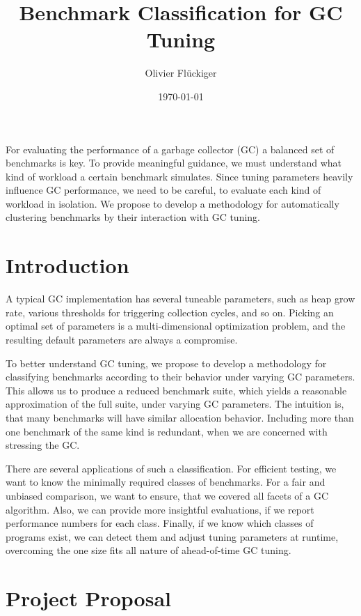 \documentclass[12pt]{article}
\title{Benchmark Classification for GC Tuning}
\author{Olivier Fl\"uckiger}
\date{\today}
\begin{document}
\maketitle

\abstract

For evaluating the performance of a garbage collector (GC) a balanced set of benchmarks is key.
To provide meaningful guidance, we must understand what kind of workload a certain benchmark simulates.
Since tuning parameters heavily influence GC performance, we need to be careful, to evaluate each kind of workload in isolation.
We propose to develop a methodology for automatically clustering benchmarks by their interaction with GC tuning.

\section{Introduction}

A typical GC implementation has several tuneable parameters, such as heap grow rate, various thresholds for triggering collection cycles, and so on.
Picking an optimal set of parameters is a multi-dimensional optimization problem, and the resulting default parameters are always a compromise.

To better understand GC tuning, we propose to develop a methodology for classifying benchmarks according to their behavior under varying GC parameters.
This allows us to produce a reduced benchmark suite, which yields a reasonable approximation of the full suite, under varying GC parameters.
The intuition is, that many benchmarks will have similar allocation behavior.
Including more than one benchmark of the same kind is redundant, when we are concerned with stressing the GC.

There are several applications of such a classification.
For efficient testing, we want to know the minimally required classes of benchmarks.
For a fair and unbiased comparison, we want to ensure, that we covered all facets of a GC algorithm.
Also, we can provide more insightful evaluations, if we report performance numbers for each class.
Finally, if we know which classes of programs exist, we can detect them and adjust tuning parameters at runtime, overcoming the one size fits all nature of ahead-of-time GC tuning.

\section{Project Proposal}
\end{document}
